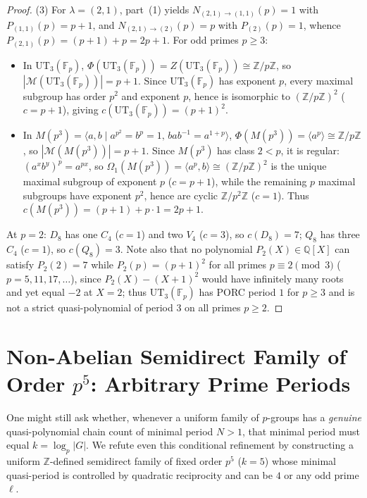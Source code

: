 \documentclass[11pt,a4paper]{article}
\theoremstyle{definition}
\newcommand{\UT}{\mathrm{UT}}
\newcommand{\Fp}{\mathbb{F}_p}
\begin{document}
\begin{proof}
(3) For $\lambda = (2, 1)$, part~(1) yields $N_{(2,1)\to(1,1)}(p) = 1$ with $P_{(1,1)}(p) = p + 1$, and $N_{(2,1)\to(2)}(p) = p$ with $P_{(2)}(p) = 1$, whence $P_{(2,1)}(p) = (p + 1) + p = 2p + 1$. For odd primes $p \ge 3$:
\begin{itemize}
  \item In $\UT_3(\Fp)$, $\Phi(\UT_3(\Fp)) = Z(\UT_3(\Fp)) \cong \mathbb{Z}/p\mathbb{Z}$, so $|\mathcal{M}(\UT_3(\Fp))| = p + 1$. Since $\UT_3(\Fp)$ has exponent $p$, every maximal subgroup has order $p^2$ and exponent $p$, hence is isomorphic to $(\mathbb{Z}/p\mathbb{Z})^2$ ($c = p + 1$), giving $c(\UT_3(\Fp)) = (p + 1)^2$.
  \item In $M(p^3) = \langle a, b \mid a^{p^2} = b^p = 1,\, b a b^{-1} = a^{1+p} \rangle$, $\Phi(M(p^3)) = \langle a^p \rangle \cong \mathbb{Z}/p\mathbb{Z}$, so $|\mathcal{M}(M(p^3))| = p + 1$. Since $M(p^3)$ has class $2 < p$, it is regular: $(a^x b^y)^p = a^{px}$, so $\Omega_1(M(p^3)) = \langle a^p, b \rangle \cong (\mathbb{Z}/p\mathbb{Z})^2$ is the unique maximal subgroup of exponent $p$ ($c = p + 1$), while the remaining $p$ maximal subgroups have exponent $p^2$, hence are cyclic $\mathbb{Z}/p^2\mathbb{Z}$ ($c = 1$). Thus $c(M(p^3)) = (p + 1) + p \cdot 1 = 2p + 1$.
\end{itemize}
At $p = 2$: $D_8$ has one $C_4$ ($c = 1$) and two $V_4$ ($c = 3$), so $c(D_8) = 7$; $Q_8$ has three $C_4$ ($c = 1$), so $c(Q_8) = 3$. Note also that no polynomial $P_2(X) \in \mathbb{Q}[X]$ can satisfy $P_2(2) = 7$ while $P_2(p) = (p+1)^2$ for all primes $p \equiv 2 \pmod 3$ ($p = 5, 11, 17, \dots$), since $P_2(X) - (X+1)^2$ would have infinitely many roots and yet equal $-2$ at $X = 2$; thus $\UT_3(\Fp)$ has PORC period $1$ for $p \ge 3$ and is not a strict quasi-polynomial of period $3$ on all primes $p \ge 2$.
\end{proof}

\section{Non-Abelian Semidirect Family of Order $p^5$: Arbitrary Prime Periods}

One might still ask whether, whenever a uniform family of $p$-groups has a \emph{genuine} quasi-polynomial chain count of minimal period $N > 1$, that minimal period must equal $k = \log_p |G|$. We refute even this conditional refinement by constructing a uniform $\mathbb{Z}$-defined semidirect family of fixed order $p^5$ ($k = 5$) whose minimal quasi-period is controlled by quadratic reciprocity and can be $4$ or any odd prime $\ell$.
\end{document}
